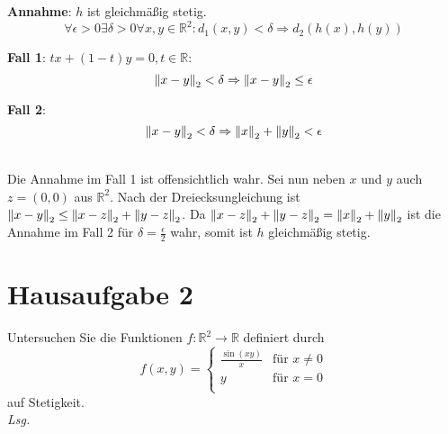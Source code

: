 \documentclass{scrreprt}
\begin{document}
\begin{enumerate}[(i)]
  \textbf{Annahme}: $h$ ist gleichmäßig stetig.
  \[
    \forall \epsilon > 0 \exists \delta > 0 \forall x, y \in \mathbb{R}^2 \colon d_1(x, y) < \delta
    \Rightarrow d_2(h(x), h(y))
  \]
  \begin{minipage}[t]{.45\textwidth}
    \textbf{Fall 1}: $tx + (1 - t)y = 0, t \in \mathbb{R}$:
    \[
      \norm{x - y}_2 < \delta \Rightarrow \norm{x - y}_2 \leq \epsilon
    \]
  \end{minipage}
  \vrule
  \hfill
  \begin{minipage}[t]{.45\textwidth}
    \textbf{Fall 2}:
    \[
      \norm{x - y}_2 < \delta \Rightarrow \norm{x}_2 + \norm{y}_2 < \epsilon
    \]
  \end{minipage} \\

  Die Annahme im Fall 1 ist offensichtlich wahr.
  Sei nun neben $x$ und $y$ auch $z = (0, 0)$ aus $\mathbb{R}^2$.
  Nach der Dreiecksungleichung ist
  $\norm{x - y}_2 \leq \norm{x - z}_2 + \norm{y - z}_2$.
  Da $\norm{x - z}_2 + \norm{y - z}_2 = \norm{x}_2 + \norm{y}_2$ ist die Annahme
  im Fall 2 für $\delta = \frac{\epsilon}{2}$ wahr, somit ist $h$ gleichmäßig
  stetig.

\end{enumerate}

\newpage
\section*{Hausaufgabe 2}

Untersuchen Sie die Funktionen $f \colon \mathbb{R}^2 \to \mathbb{R}$ definiert
durch
\[
  f(x, y) = \begin{cases}
    \frac{\sin(xy)}{x} & \text{für } x \ne 0 \\
    y & \text{für } x = 0 \\
  \end{cases}
\]
auf Stetigkeit. \\

\textit{Lsg.}
\begin{center}
\end{center}
\end{document}
